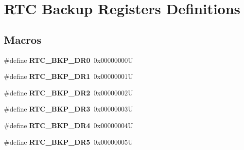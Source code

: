 \hypertarget{group___r_t_c_ex___backup___registers___definitions}{}\section{R\+TC Backup Registers Definitions}
\label{group___r_t_c_ex___backup___registers___definitions}
\subsection*{Macros}
\begin{DoxyCompactItemize}
\item 
\mbox{\label{group___r_t_c_ex___backup___registers___definitions_ga519bec4c7714e123cf2664f7394dc1ab}} 
\#define {\bfseries R\+T\+C\+\_\+\+B\+K\+P\+\_\+\+D\+R0}~0x00000000U
\item 
\mbox{\label{group___r_t_c_ex___backup___registers___definitions_ga6988b61b031e1407787095b0ff214ea8}} 
\#define {\bfseries R\+T\+C\+\_\+\+B\+K\+P\+\_\+\+D\+R1}~0x00000001U
\item 
\mbox{\label{group___r_t_c_ex___backup___registers___definitions_ga09963fdfb90ed5b7e32db13671447abb}} 
\#define {\bfseries R\+T\+C\+\_\+\+B\+K\+P\+\_\+\+D\+R2}~0x00000002U
\item 
\mbox{\label{group___r_t_c_ex___backup___registers___definitions_ga014a39228ba4783b62ac8f11929ecd6a}} 
\#define {\bfseries R\+T\+C\+\_\+\+B\+K\+P\+\_\+\+D\+R3}~0x00000003U
\item 
\mbox{\label{group___r_t_c_ex___backup___registers___definitions_ga97545ebe0827a8650f953c371368f3f5}} 
\#define {\bfseries R\+T\+C\+\_\+\+B\+K\+P\+\_\+\+D\+R4}~0x00000004U
\item 
\mbox{\label{group___r_t_c_ex___backup___registers___definitions_gacab50ce68839698c48b8e2e143656ae7}} 
\#define {\bfseries R\+T\+C\+\_\+\+B\+K\+P\+\_\+\+D\+R5}~0x00000005U
\item 

\end{DoxyCompactItemize}
